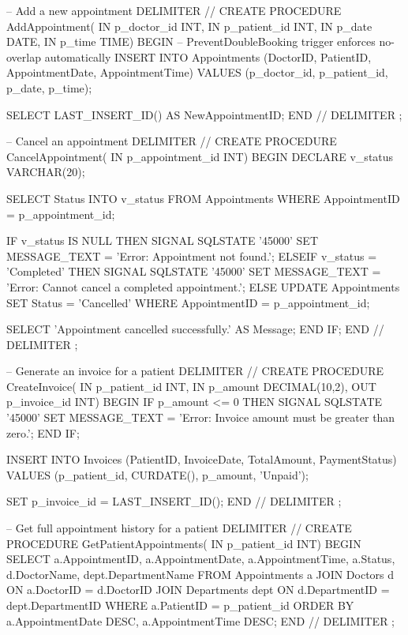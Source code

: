 \begin{sqlcode}
-- Add a new appointment
DELIMITER //
CREATE PROCEDURE AddAppointment(
    IN p_doctor_id  INT,
    IN p_patient_id INT,
    IN p_date DATE,
    IN p_time TIME)
BEGIN
    -- PreventDoubleBooking trigger enforces no-overlap automatically
    INSERT INTO Appointments (DoctorID, PatientID, AppointmentDate, AppointmentTime)
    VALUES (p_doctor_id, p_patient_id, p_date, p_time);

    SELECT LAST_INSERT_ID() AS NewAppointmentID;
END //
DELIMITER ;

-- Cancel an appointment
DELIMITER //
CREATE PROCEDURE CancelAppointment(
    IN p_appointment_id INT)
BEGIN
    DECLARE v_status VARCHAR(20);

    SELECT Status INTO v_status
    FROM Appointments
    WHERE AppointmentID = p_appointment_id;

    IF v_status IS NULL THEN
        SIGNAL SQLSTATE '45000'
            SET MESSAGE_TEXT = 'Error: Appointment not found.';
    ELSEIF v_status = 'Completed' THEN
        SIGNAL SQLSTATE '45000'
            SET MESSAGE_TEXT = 'Error: Cannot cancel a completed appointment.';
    ELSE
        UPDATE Appointments
        SET Status = 'Cancelled'
        WHERE AppointmentID = p_appointment_id;

        SELECT 'Appointment cancelled successfully.' AS Message;
    END IF;
END //
DELIMITER ;

-- Generate an invoice for a patient
DELIMITER //
CREATE PROCEDURE CreateInvoice(
    IN  p_patient_id INT,
    IN  p_amount DECIMAL(10,2),
    OUT p_invoice_id INT)
BEGIN
    IF p_amount <= 0 THEN
        SIGNAL SQLSTATE '45000'
            SET MESSAGE_TEXT = 'Error: Invoice amount must be greater than zero.';
    END IF;

    INSERT INTO Invoices (PatientID, InvoiceDate, TotalAmount, PaymentStatus)
    VALUES (p_patient_id, CURDATE(), p_amount, 'Unpaid');

    SET p_invoice_id = LAST_INSERT_ID();
END //
DELIMITER ;

-- Get full appointment history for a patient
DELIMITER //
CREATE PROCEDURE GetPatientAppointments(
    IN p_patient_id INT)
BEGIN
    SELECT
        a.AppointmentID,
        a.AppointmentDate,
        a.AppointmentTime,
        a.Status,
        d.DoctorName,
        dept.DepartmentName
    FROM Appointments  a
    JOIN Doctors d ON a.DoctorID = d.DoctorID
    JOIN Departments dept ON d.DepartmentID = dept.DepartmentID
    WHERE a.PatientID = p_patient_id
    ORDER BY a.AppointmentDate DESC, a.AppointmentTime DESC;
END //
DELIMITER ;


\end{sqlcode}
